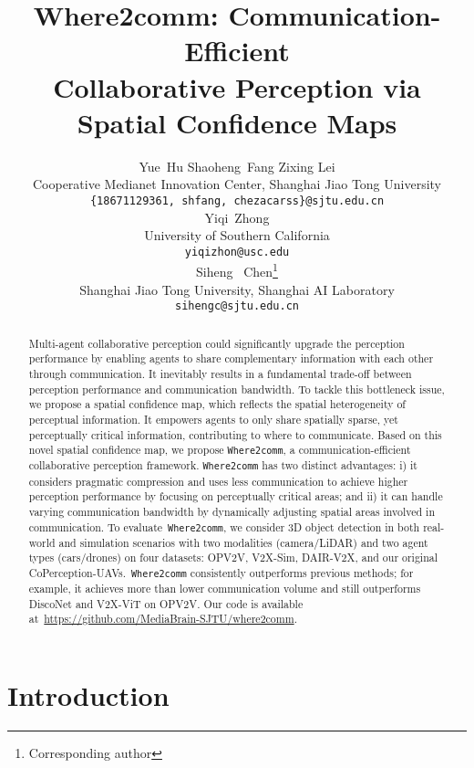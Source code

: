\documentclass{article}
\author{Yue~Hu \hspace{1.75cm} Shaoheng~Fang \hspace{1.75cm} Zixing Lei \\
  Cooperative Medianet Innovation Center, Shanghai Jiao Tong University \\
  \texttt{\{18671129361, shfang, chezacarss\}@sjtu.edu.cn} \\
  \AND
  Yiqi~Zhong \\
University of Southern California \\
  \texttt{yiqizhon@usc.edu} \\
  \And
  Siheng ~Chen\thanks{Corresponding author} \\
  Shanghai Jiao Tong University,  Shanghai AI Laboratory \\
  \texttt{sihengc@sjtu.edu.cn}
}
\begin{document}
\title{ Where2comm: Communication-Efficient \\ Collaborative Perception via Spatial Confidence Maps}
\maketitle

\begin{abstract}
Multi-agent collaborative perception could significantly upgrade the perception performance by enabling agents to share complementary information with each other through communication. It inevitably results in a fundamental trade-off between perception performance and communication bandwidth. To tackle this bottleneck issue, we propose a spatial confidence map, which reflects the spatial heterogeneity of perceptual information. It empowers agents to only share spatially sparse, yet perceptually critical information, contributing to where to communicate. Based on this novel spatial confidence map, we propose \texttt{Where2comm}, a communication-efficient collaborative perception framework. \texttt{Where2comm} has two distinct advantages: i) it considers pragmatic compression and uses less communication to achieve higher perception performance by focusing on perceptually critical areas; and ii) it can handle varying communication bandwidth by dynamically adjusting spatial areas involved in communication. To evaluate~\texttt{Where2comm}, we consider 3D object detection in both real-world and simulation scenarios with two modalities (camera/LiDAR) and two agent types (cars/drones) on four datasets: OPV2V, V2X-Sim, DAIR-V2X, and our original CoPerception-UAVs.~\texttt{Where2comm} consistently outperforms previous methods; for example, it achieves more than  lower communication volume and still outperforms DiscoNet and V2X-ViT on OPV2V. Our code is available at~\url{https://github.com/MediaBrain-SJTU/where2comm}.
\vspace{-2mm}









\end{abstract} \vspace{-3mm}
\section{Introduction}\label{intro}
\vspace{-2mm}
\end{document}
